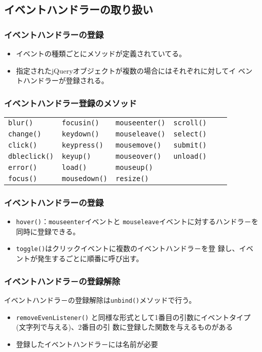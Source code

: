\subsection{イベントハンドラーの取り扱い}
\begin{frame}[containsverbatim]
\frametitle{イベントハンドラーの登録}
\begin{itemize}
 \item イベントの種類ごとにメソッドが定義されていてる。
 \item 指定されたjQueryオブジェクトが複数の場合にはそれぞれに対してイ
ベントハンドラーが登録される。
\end{itemize}
\end{frame}
\begin{frame}[containsverbatim]
\frametitle{イベントハンドラー登録のメソッド}
 \begin{tabular}{llllll}
\texttt{blur()}& \texttt{focusin()}&\texttt{mouseenter()} &\texttt{scroll()}\\
\texttt{change()}&\texttt{keydown()}&\texttt{mouseleave()} &\texttt{select()} \\
  \texttt{click()}& \texttt{keypress()} &\texttt{mousemove()} &\texttt{submit()} \\
\texttt{dbleclick()}& \texttt{keyup()} &\texttt{mouseover()}& \texttt{unload()} \\
\texttt{error()}&\texttt{load()} &\texttt{mouseup()} &\\
 \texttt{focus()}&\texttt{mousedown()}&\texttt{resize()}&\\
 \end{tabular}
\end{frame}
\begin{frame}[containsverbatim]
\frametitle{イベントハンドラーの登録}
\begin{itemize}
 \item \texttt{hover()}：\texttt{mouseenter}イベントと
       \texttt{mouseleave}イベントに対するハンドラ－を同時に登録できる。
 \item \texttt{toggle()}はクリックイベントに複数のイベントハンドラ－を登
       録し、イベントが発生するごとに順番に呼び出す。
\end{itemize}
\end{frame}
\begin{frame}[containsverbatim]
 \frametitle{イベントハンドラ－の登録解除}
 イベントハンドラ－の登録解除は\texttt{unbind()}メソッドで行う。
 \begin{itemize}
  \item \texttt{removeEvenListener()}
と同様な形式として1番目の引数にイベントタイプ(文字列で与える)、2番目の引
数に登録した関数を与えるものがある
  \item 登録したイベントハンドラ－には名前が必要
 \end{itemize}
\end{frame}
